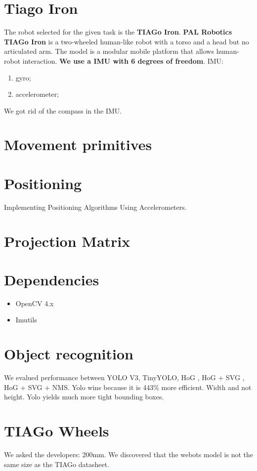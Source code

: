\documentclass[a4paper]{article}
\begin{document}
	\section{Tiago Iron} 
	The robot selected for the given task is the \textbf{TIAGo Iron}. \newline\textbf{PAL Robotics TIAGo Iron}\cite{tiagoiron} is a two-wheeled human-like robot with a torso and a head but no articulated arm. The model is a modular mobile platform that allows human-robot interaction.
	\textbf{We use a IMU with 6 degrees of freedom}.
	IMU:
		\begin{enumerate}
			\item gyro;	
			\item accelerometer;
		\end{enumerate}
	
	We got rid of the compass in the IMU.
	
	\section{Movement primitives}
	\cite{positioning}
	
	\section{Positioning}
	Implementing Positioning Algorithms Using Accelerometers.
	
	\section{Projection Matrix}
	\cite{OpenGL}
	
	\section{Dependencies}
	\begin{itemize}
		\item OpenCV 4.x
		\item Imutils
	\end{itemize}
	
	\section{Object recognition}
	We evalued performance between YOLO V3, TinyYOLO, HoG , HoG + SVG  , HoG + SVG + NMS. Yolo wins because it is 443\% more efficient. Width and not height. Yolo yields much more tight bounding boxes. 
	
	\section{TIAGo Wheels}
	We asked the developers: 200mm. We discovered that the webots model is not the same size as the TIAGo datasheet.
	
\end{document}
